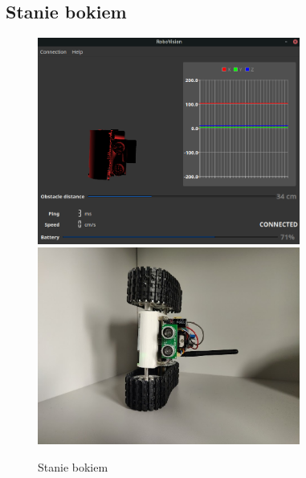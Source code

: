 \documentclass[12pt,a4paper,polish]{article}
\begin{document}
  \subsection{Stanie bokiem}
  \begin{figure}[h]
    \centering
    \includegraphics[width=0.77\textwidth]{img/final/4.png}
    \includegraphics[width=0.77\textwidth]{img/final/4e.jpg}
    \caption{Stanie bokiem}
  \end{figure}


  
  


\end{document}
